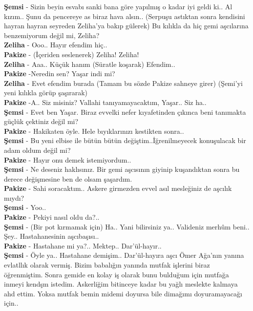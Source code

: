 \documentclass[]{book}
\begin{document}
\textbf{Şemsi} - Sizin beyin esvabı sanki bana göre yapılmış o kadar iyi geldi ki.. Al kızım.. Şunu da pencereye as biraz hava alsın.. (Serpuşu astıktan sonra kendisini hayran hayran seyreden Zeliha'ya bakıp gülerek) Bu kılıkla da hiç gemi aşcılarına benzemiyorum değil mi, Zeliha?\\
\textbf{Zeliha} - Ooo.. Hayır efendim hiç..\\
\textbf{Pakize} - (İçeriden seslenerek) Zeliha! Zeliha!\\
\textbf{Zeliha} - Aaa.. Küçük hanım (Süratle koşarak) Efendim..\\
\textbf{Pakize} -Neredin sen? Yaşar indi mi?\\
\textbf{Zeliha} - Evet efendim burada (Tamam bu sözde Pakize sahneye girer) (Şemi'yi yeni kılıkla görüp şaşırarak)\\
\textbf{Pakize} -A.. Siz misiniz? Vallahi tanıyamayacaktım,
Yaşar.. Siz ha..\\
\textbf{Şemsi} - Evet ben Yaşar. Biraz evvelki nefer kıyafetinden çıkınca beni tanımakta güçlük çektiniz değil mi?\\
\textbf{Pakize} - Hakikaten öyle. Hele bıyıklarınızı kestikten sonra..\\
\textbf{Şemsi} - Bu yeni elbise ile bütün bütün değiştim..İğrenilmeyecek konuşulacak bir adam oldum değil mi?\\
\textbf{Pakize} - Hayır onu demek istemiyordum..\\
\textbf{Şemsi} - Ne deseniz haklısınız. Bir gemi aşcısının giyinip kuşandıktan sonra bu derece değişmesine ben de olsam şaşardım.\\
\textbf{Pakize} - Sahi soracaktım.. Askere girmezden evvel asıl mesleğiniz de aşcılık mıydı?\\
\textbf{Şemsi} - Yoo..\\
\textbf{Pakize} - Pekiyi nasıl oldu da?..\\
\textbf{Şemsi} - (Bir pot kırmamak için) Ha.. Yani bilirsiniz ya.. Valideniz merhûm beni.. Şey.. Hastahanesinin aşcıbaşısı..\\
\textbf{Pakize} - Hastahane mi ya?.. Mektep.. Dar'ül-hayır..\\
\textbf{Şemsi} - Öyle ya.. Hastahane demişim.. Dar'ül-hayıra aşcı Ömer Ağa'nın yanına evlatllık olarak vermiş. Bizim babalığın yanında mutfak işlerini biraz öğrenmiştim. Sonra gemide en kolay iş olarak bunu bulduğum için mutfağa inmeyi kendşm istedim. Askerliğim bitinceye kadar bu yağlı meslekte kalmaya ahd ettim. Yoksa mutfak bemin midemi doyursa bile dimağımı doyuramayacağı için..\\
\end{document}
